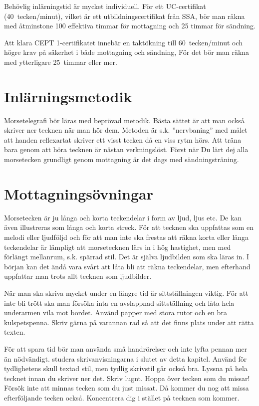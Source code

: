 Behövlig inlärningstid är mycket individuell.
För ett UC-certifikat (40~tecken/minut), vilket är ett utbildningscertifikat
från SSA, bör man räkna med åtminstone 100 effektiva timmar för mottagning
och 25 timmar för sändning.

Att klara CEPT 1-certifikatet innebär en taktökning till 60~tecken/minut och
högre krav på säkerhet i både mottagning och sändning, För det bör man räkna med
ytterligare 25~timmar eller mer.

\section{Inlärningsmetodik}

Morsetelegrafi bör läras med beprövad metodik. Bästa sättet är att man också
skriver ner tecknen när man hör dem. Metoden är s.k. ''nervbaning'' med målet att
handen reflexartat skriver ett visst tecken då en viss rytm hörs. Att träna bara
genom att höra tecknen är nästan verkningslöst. Först när Du lärt dej alla
morsetecken grundligt genom mottagning är det dags med sändningsträning.

\section{Mottagnings\-övningar}

Morsetecken är ju långa och korta teckendelar i form av ljud, ljus etc. De kan
även illustreras som långa och korta streck. För att tecknen ska uppfattas som
en melodi eller ljudföljd och för att man inte ska frestas att räkna korta
eller långa teckendelar är lämpligt att morsetecknen lärs in i hög hastighet,
men med förlängt mellanrum, s.k. spärrad stil. Det är själva ljudbilden som
ska läras in. I början kan det ändå vara svårt att låta bli att räkna
teckendelar, men efterhand uppfattar man trots allt tecknen som ljudbilder.

När man ska skriva mycket under en längre tid är sittställningen viktig. För
att inte bli trött ska man försöka inta en avslappnad sittställning och låta
hela underarmen vila mot bordet. Använd papper med stora rutor och en bra
kulspetspenna. Skriv gärna på varannan rad så att det finns plats under att
rätta texten.

För att spara tid bör man använda små handrörelser och inte lyfta pennan mer än
nödvändigt. studera skrivanvisningarna i slutet av detta kapitel. Använd för
tydlighetens skull textad stil, men tydlig skrivstil går också bra. Lyssna på
hela tecknet innan du skriver ner det. Skriv lugnt. Hoppa över tecken som du
missar! Försök inte att minnas tecken som du just missat. Då kommer du nog att
missa efterföljande tecken också. Koncentrera dig i stället på tecknen som
kommer.


